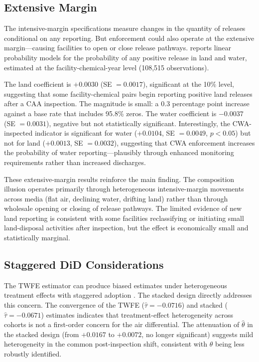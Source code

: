 \documentclass[12pt]{article}
\begin{document}
\subsection{Extensive Margin}

The intensive-margin specifications measure changes in the quantity of releases conditional on any reporting. But enforcement could also operate at the extensive margin---causing facilities to open or close release pathways.  reports linear probability models for the probability of any positive release in land and water, estimated at the facility-chemical-year level (108,515 observations).

The land coefficient is $+0.0030$ (SE $= 0.0017$), significant at the 10\% level, suggesting that some facility-chemical pairs begin reporting positive land releases after a CAA inspection. The magnitude is small: a 0.3 percentage point increase against a base rate that includes 95.8\% zeros. The water coefficient is $-0.0037$ (SE $= 0.0031$), negative but not statistically significant. Interestingly, the CWA-inspected indicator is significant for water ($+0.0104$, SE $= 0.0049$, $p < 0.05$) but not for land ($+0.0013$, SE $= 0.0032$), suggesting that CWA enforcement increases the probability of water reporting---plausibly through enhanced monitoring requirements rather than increased discharges.

These extensive-margin results reinforce the main finding. The composition illusion operates primarily through heterogeneous intensive-margin movements across media (flat air, declining water, drifting land) rather than through wholesale opening or closing of release pathways. The limited evidence of new land reporting is consistent with some facilities reclassifying or initiating small land-disposal activities after inspection, but the effect is economically small and statistically marginal.

\subsection{Staggered DiD Considerations}

The TWFE estimator can produce biased estimates under heterogeneous treatment effects with staggered adoption \citep{callawaysantanna2021, dechaisemartin2020, sunab2021}. The stacked design directly addresses this concern. The convergence of the TWFE ($\hat{\tau} = -0.0716$) and stacked ($\hat{\tau} = -0.0671$) estimates indicates that treatment-effect heterogeneity across cohorts is not a first-order concern for the air differential. The attenuation of $\hat{\theta}$ in the stacked design (from $+0.0167$ to $+0.0072$, no longer significant) suggests mild heterogeneity in the common post-inspection shift, consistent with $\theta$ being less robustly identified.
\end{document}
